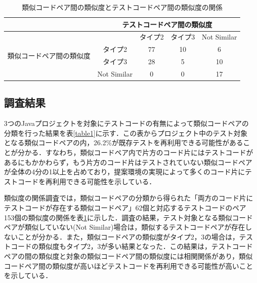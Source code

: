 \documentclass{fose2019}           %
\begin{document}
\begin{table}[]
\centering
\caption{類似コードペア間の類似度とテストコードペア間の類似度の関係}
\label{table2}
\begin{tabular}{|c|c|c|c|c|}
\hline
                             & \multicolumn{4}{c|}{\scriptsize テストコードペア間の類似度}         \\ \hline
\multirow{4}{*}{\scriptsize 類似コードペア間の類似度} &             & \scriptsize タイプ2 & \scriptsize タイプ3 & \scriptsize Not Similar \\ \cline{2-5} 
                             & \scriptsize タイプ2 & \scriptsize 77          & \scriptsize 10     & \scriptsize 6     \\ \cline{2-5} 
                             &\scriptsize タイプ3       & \scriptsize 28           & \scriptsize 5    & \scriptsize 10    \\ \cline{2-5} 
                             & \scriptsize Not Similar       & \scriptsize 0           & \scriptsize 0    & \scriptsize 17     \\ \hline
\end{tabular}
\end{table}


\subsection{調査結果}
3つのJavaプロジェクトを対象にテストコードの有無によって類似コードペアの分類を行った結果を表\ref{table1}に示す．この表からプロジェクト中のテスト対象となる類似コードペアの内，26.2\%が既存テストを再利用できる可能性があることが分かる．すなわち，類似コードペア内で片方のコード片にはテストコードがあるにもかかわらず，もう片方のコード片はテストされていない類似コードペアが全体の4分の1以上を占めており，提案環境の実現によって多くのコード片にテストコードを再利用できる可能性を示している．

\indent 類似度の関係調査では，類似コードペアの分類から得られた「両方のコード片にテストコードが存在する類似コードペア」62個と対応するテストコードのペア153個の類似度の関係を表\ref{table2}に示した．調査の結果，テスト対象となる類似コードペアが類似していない(Not Similar)場合は，類似するテストコードペアが存在しないことが分かる．また，類似コードペアの類似度がタイプ2，3の場合は，テストコードの類似度もタイプ2，3が多い結果となった．この結果は，テストコードペアの間の類似度と対象の類似コードペア間の類似度には相関関係があり，類似コードペア間の類似度が高いほどテストコードを再利用できる可能性が高いことを示している．
\end{document}
